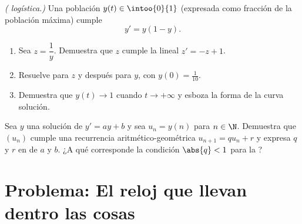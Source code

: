 \begin{exercise}[$\star\star\star$]\label{exo:g12:diffeq:8}
\emph{( logística.)} Una población $y(t) \in \intoo{0}{1}$
(expresada como fracción de la población máxima) cumple
\[
y' = y(1 - y).
\]
\begin{enumerate}
  \item Sea $z = \dfrac{1}{y}$. Demuestra que $z$ cumple la  lineal
        $z' = -z + 1$.
  \item Resuelve para $z$ y después para $y$, con $y(0) = \frac{1}{10}$.
  \item Demuestra que $y(t) \to 1$ cuando $t \to +\infty$ y esboza la forma
        de la curva solución.
\end{enumerate}
\end{exercise}

\begin{exercise}[$\star\star\star$]\label{exo:g12:diffeq:9}
Sea $y$ una solución de $y' = ay + b$ y sea $u_n = y(n)$ para $n \in \N$.
Demuestra que $(u_n)$ cumple una recurrencia aritmético-geométrica
$u_{n+1} = q u_n + r$ y expresa $q$ y $r$ en  de $a$ y $b$. ¿A qué
corresponde la condición $\abs{q} < 1$ para la ?
\end{exercise}

\section{Problema: El reloj que llevan dentro las cosas}

